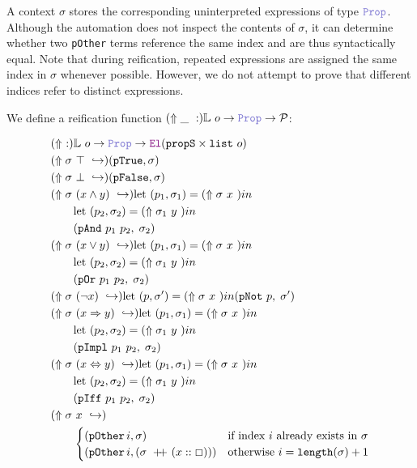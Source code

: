A context $\sigma$ stores the corresponding uninterpreted expressions of type $\prop$.
Although the automation does not inspect the contents of $\sigma$, it can determine whether two \texttt{pOther} terms reference the same index and are thus syntactically equal.
Note that during reification, repeated expressions are assigned the same index in $\sigma$ whenever possible.
However, we do not attempt to prove that different indices refer to distinct expressions.

\begin{definition}
We define a reification function $\reify{\_} : \mathbb{L}~o \rightarrow \prop \rightarrow \mathcal{P}$:

\begin{align*}
&\reify{}: \bb{L}~o \ra \prop \ra \el (\kw{propS} \times \kw{list}~o) \\
&\reify{\sigma~\top} \re  (\kw{pTrue}, \sigma) \\
&\reify{\sigma~\bot} \re  (\kw{pFalse}, \sigma) \\
&\reify{\sigma~(x \land y)} \re 
  \text{let } (p_1,\sigma_1) = \reify{\sigma~x} \text{ in} \\
&\qquad\text{let } (p_2,\sigma_2) = \reify{\sigma_1~y} \text{ in} \\
&\qquad(\kw{pAnd}~p_1~p_2,\; \sigma_2) \\
&\reify{\sigma~(x \lor y)} \re 
  \text{let } (p_1,\sigma_1) = \reify{\sigma~x} \text{ in} \\
&\qquad\text{let } (p_2,\sigma_2) = \reify{\sigma_1~y} \text{ in} \\
&\qquad(\kw{pOr}~p_1~p_2,\; \sigma_2) \\
&\reify{\sigma~(\neg x)} \re 
  \text{let } (p,\sigma') = \reify{\sigma~x} \text{ in } (\kw{pNot}~p,\; \sigma') \\
&\reify{\sigma~(x \Rightarrow y)} \re 
  \text{let } (p_1,\sigma_1) = \reify{\sigma~x} \text{ in} \\
&\qquad\text{let } (p_2,\sigma_2) = \reify{\sigma_1~y} \text{ in} \\
&\qquad(\kw{pImpl}~p_1~p_2,\; \sigma_2) \\
&\reify{\sigma~(x \Leftrightarrow y)} \re 
  \text{let } (p_1,\sigma_1) = \reify{\sigma~x} \text{ in} \\
&\qquad\text{let } (p_2,\sigma_2) = \reify{\sigma_1~y} \text{ in} \\
&\qquad(\kw{pIff}~p_1~p_2,\; \sigma_2) \\
&\reify{\sigma~x} \re \\
&\qquad\begin{cases}
  (\kw{pOther}\,i, \sigma) & \text{if index }  i \text{ already exists in } \sigma \\
  (\kw{pOther}\,i, (\sigma \concat (x::\Box))) & \text{otherwise } i = \kw{length}(\sigma) + 1
\end{cases} \\
\end{align*}


\end{definition}
